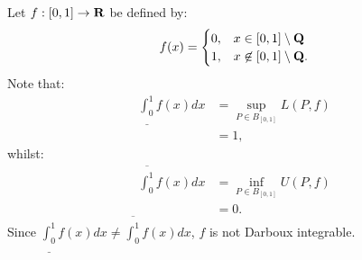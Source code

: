 \documentclass[10pt,twoside,openany]{memoir}
\begin{document}
    \begin{example}
        Let $f:[0,1] \rightarrow \mathbf{R}$ be defined by:
            \begin{equation*}
            \begin{split}
                f(x) = \begin{cases}
                    0,& x\in [0,1]\setminus\mathbf{Q} \\
                    1,& x\not\in[0,1]\setminus\mathbf{Q}.
                \end{cases}
            \end{split}
            \end{equation*}
        Note that:
            \begin{equation*}
            \begin{split}
                \underline{\int_{0}^1}f(x)dx 
                & = \sup_{P \in B_{[0,1]}}L(P,f) \\
                & = 1,
            \end{split}
            \end{equation*}
        whilst:
            \begin{equation*}
            \begin{split}
                \overline{\int_{0}^1}f(x)dx 
                & = \inf_{P \in B_{[0,1]}}U(P,f) \\
                & = 0.
            \end{split}
            \end{equation*}
        Since $\underline{\int_{0}^1}f(x)dx \neq \overline{\int_{0}^1}f(x)dx$, $f$ is not Darboux integrable.
    \end{example}
\end{document}
